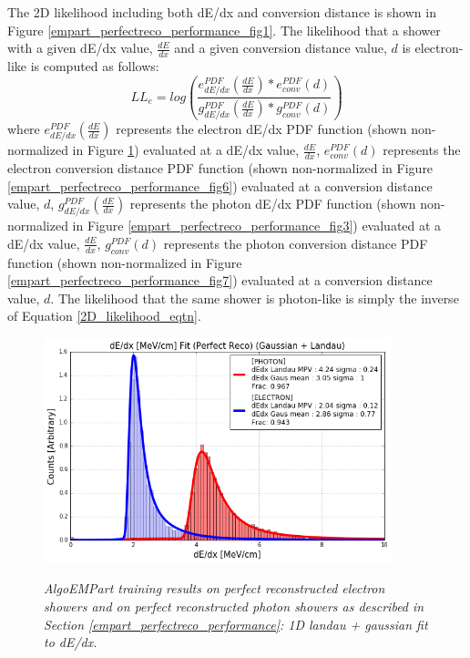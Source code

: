 The 2D likelihood including both dE/dx and conversion distance is shown in Figure \ref{empart_perfectreco_performance_fig1}. The likelihood that a shower with a given dE/dx value, $\frac{dE}{dx}$ and a given conversion distance value, $d$ is electron-like is computed as follows: 
\begin{equation}\label{2D_likelihood_eqtn}
LL_e=log( \frac{e_{dE/dx}^{PDF}(\frac{dE}{dx}) * e_{conv}^{PDF}(d)}{g_{dE/dx}^{PDF}(\frac{dE}{dx}) * g_{conv}^{PDF}(d)} )
\end{equation}
where $e_{dE/dx}^{PDF}(\frac{dE}{dx})$ represents the electron dE/dx PDF function (shown non-normalized in Figure \ref{empart_perfectreco_performance_fig2}) evaluated at a dE/dx value, $\frac{dE}{dx}$, $e_{conv}^{PDF}(d)$ represents the electron conversion distance PDF function (shown non-normalized in Figure \ref{empart_perfectreco_performance_fig6}) evaluated at a conversion distance value, $d$, $g_{dE/dx}^{PDF}(\frac{dE}{dx})$ represents the photon dE/dx PDF function (shown non-normalized in Figure \ref{empart_perfectreco_performance_fig3}) evaluated at a dE/dx value, $\frac{dE}{dx}$, $g_{conv}^{PDF}(d)$ represents the photon conversion distance PDF function (shown non-normalized in Figure \ref{empart_perfectreco_performance_fig7}) evaluated at a conversion distance value, $d$. The likelihood that the same shower is photon-like is simply the inverse of Equation \ref{2D_likelihood_eqtn}.\\


\begin{figure}[ht!]
\centering
\includegraphics[width=0.9\textwidth]{Figures/EMPartTraining/mc_trained/dEdx_Selected_both.png}\\
\caption{\textit{AlgoEMPart training results on perfect reconstructed electron showers and on perfect reconstructed photon showers as described in Section \ref{empart_perfectreco_performance}: 1D landau + gaussian fit to dE/dx.}}
\label{empart_perfectreco_performance_fig2}
\end{figure}

